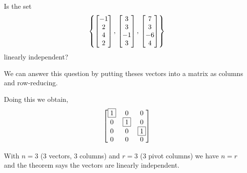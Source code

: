 \documentclass{ximera}
\author{Robert Beezer}
\begin{document}
\begin{exercise}
  Is the set 
  \[
    \left\{\begin{bmatrix}-1\\2\\4\\2\end{bmatrix},\,\begin{bmatrix}3\\3\\-1\\3\end{bmatrix},\,\begin{bmatrix}7\\3\\-6\\4\end{bmatrix}\right\}
  \]
  linearly independent?

  \begin{hint}
    We can answer this question by putting theses vectors into a matrix as columns and row-reducing.
  \end{hint}
  
  \begin{hint}
    Doing this we obtain,
    \[
      \begin{bmatrix}
        \fbox{1} & 0 & 0\\
        0 & \fbox{1} & 0\\
        0 & 0 & \fbox{1}\\
        0 & 0 & 0
      \end{bmatrix}
    \]
  \end{hint}
  
  \begin{hint}
    With $n=3$ (3 vectors, 3 columns) and $r=3$ (3 pivot columns) we
    have $n=r$ and the theorem says the vectors are linearly
    independent.
  \end{hint}
    
  \begin{multipleChoice}
  \end{multipleChoice}

\end{exercise}
\end{document}
